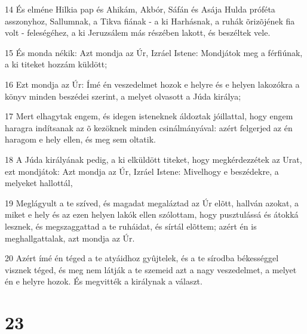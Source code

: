 \par 14 És elméne Hilkia pap és Ahikám, Akbór, Sáfán és Asája Hulda próféta asszonyhoz, Sallumnak, a Tikva fiának - a ki Harhásnak, a ruhák õrizõjének fia volt - feleségéhez, a ki Jeruzsálem más részében lakott, és beszéltek vele.
\par 15 És monda nékik: Azt mondja az Úr, Izráel Istene: Mondjátok meg a férfiúnak, a ki titeket hozzám küldött;
\par 16 Ezt mondja az Úr: Ímé én veszedelmet hozok e helyre és e helyen lakozókra a könyv minden beszédei szerint, a melyet olvasott a Júda királya;
\par 17 Mert elhagytak engem, és idegen isteneknek áldoztak jóillattal, hogy engem haragra indítsanak az õ kezöknek minden csinálmányával: azért felgerjed az én haragom e hely ellen, és meg sem oltatik.
\par 18 A Júda királyának pedig, a ki elküldött titeket, hogy megkérdezzétek az Urat, ezt mondjátok: Azt mondja az Úr, Izráel Istene: Mivelhogy e beszédekre, a melyeket hallottál,
\par 19 Meglágyult a te szíved, és magadat megaláztad az Úr elõtt, hallván azokat, a miket e hely és az ezen helyen lakók ellen szólottam, hogy pusztulássá és átokká lesznek, és megszaggattad a te ruháidat, és sírtál elõttem; azért én is meghallgattalak, azt mondja az Úr.
\par 20 Azért ímé én téged a te atyáidhoz gyûjtelek, és a te sírodba békességgel visznek téged, és meg nem látják a te szemeid azt a nagy veszedelmet, a melyet én e helyre hozok. És megvitték a királynak a választ.

\chapter{23}

